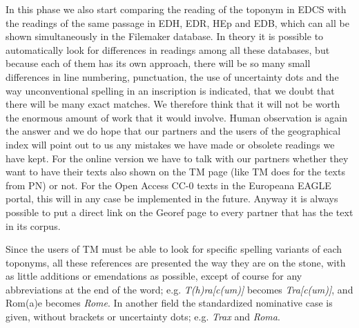 \documentclass[amsthm,ebook]{saparticle}
\begin{document}
In this phase we also start comparing the reading of the toponym in EDCS with the readings of the same passage in
EDH, EDR, HEp and EDB, which can all be shown simultaneously in the Filemaker database. In theory it is possible to
automatically look for differences in readings among all these databases, but because each of them has its own
approach, there will be so many small differences in line numbering, punctuation, the use of uncertainty dots and the
way unconventional spelling in an inscription is indicated, that we doubt that there will be many exact matches. We
therefore think that it will not be worth the enormous amount of work that it would involve. Human observation is again
the answer and we do hope that our partners and the users of the geographical index will point out to us any mistakes
we have made or obsolete readings we have kept. For the online version we have to talk with our partners whether they
want to have their texts also shown on the TM page (like TM does for the texts from PN) or not. For the Open Access
CC-0 texts in the Europeana EAGLE portal, this will in any case be implemented in the future. Anyway it is always
possible to put a direct link on the Georef page to every partner that has the text in its corpus.


Since the users of TM must be able to look for specific spelling variants of each toponyms, all these references are
presented the way they are on the stone, with as little additions or emendations as possible, except of course for any
abbreviations at the end of the word; e.g. \emph{T(h)ra[c(um)]} becomes \emph{Tra[c(um)]}, and Rom(a)e becomes \emph{Rome}. In another field the standardized nominative case is given, without brackets or uncertainty dots; e.g. \emph{Trax} and \emph{Roma}.
\end{document}
